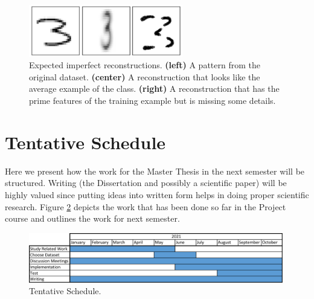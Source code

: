 \documentclass[runningheads]{llncs}
\begin{document}
\begin{figure}[h]
    \centering
    \includegraphics[width=0.6\textwidth]{introduction/img/result_prediction.png}
    \caption{Expected imperfect reconstructions. \textbf{(left)} A pattern from the original dataset. \textbf{(center)} A reconstruction that looks like the average example of the class. \textbf{(right)} A reconstruction that has the prime features of the training example but is missing some details.}
    \label{fig:imperfect_recon}
\end{figure}

\section{Tentative Schedule}
\label{sec:schedule}
Here we present how the work for the Master Thesis in the next semester will be structured.
Writing (the Dissertation and possibly a scientific paper) will be highly valued since putting ideas into written form helps in doing proper scientific research. Figure \ref{fig:schedule} depicts the work that has been done so far in the Project course and outlines the work for next semester.  
\begin{figure}[h]
    \centering
    \includegraphics[width=0.99\textwidth]{introduction/img/schedule.png}
    \caption{Tentative Schedule.}
    \label{fig:schedule}
\end{figure}
\end{document}
